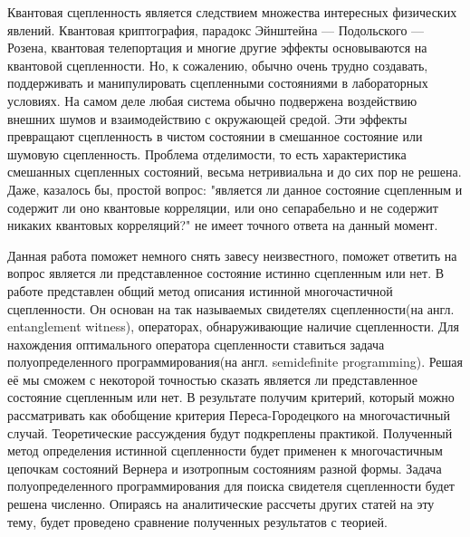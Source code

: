 Квантовая сцепленность является следствием множества интересных физических явлений.
Квантовая криптография\cite{PhysRevLett.67.661}, парадокс Эйнштейна — Подольского — Розена\cite{PhysRevLett.69.2881}, квантовая телепортация\cite{PhysRevLett.70.1895} и многие другие эффекты основываются на квантовой сцепленности.
Но, к сожалению, обычно очень трудно создавать, поддерживать и манипулировать сцепленными состояниями в лабораторных условиях.
На самом деле любая система обычно подвержена воздействию внешних шумов и взаимодействию с окружающей средой.
Эти эффекты превращают сцепленность в чистом состоянии в смешанное состояние или шумовую сцепленность.
Проблема отделимости, то есть характеристика смешанных сцепленных состояний, весьма нетривиальна и до сих пор не решена.
Даже, казалось бы, простой вопрос: "является ли данное состояние сцепленным и содержит ли оно квантовые корреляции, или оно сепарабельно и не содержит никаких квантовых корреляций?" не имеет точного ответа на данный момент.

Данная работа поможет немного снять завесу неизвестного, поможет  ответить на вопрос является ли представленное состояние истинно сцепленным или нет.
В работе представлен общий метод описания истинной многочастичной сцепленности.
Он основан на так называемых свидетелях сцепленности\cite{dariusz_2014}(на англ. entanglement witness), операторах, обнаруживающие наличие сцепленности.
Для нахождения оптимального оператора сцепленности ставиться задача полуопределенного программирования(на англ. semidefinite programming).
Решая её мы сможем с некоторой точностью сказать является ли представленное состояние сцепленным или нет.
В результате получим критерий, который можно рассматривать как обобщение критерия Переса-Городецкого\cite{criterion-peres-horodecki} на многочастичный случай.
Теоретические рассуждения будут подкреплены практикой.
Полученный метод определения истинной сцепленности будет применен к многочастичным цепочкам состояний Вернера и изотропным состояниям разной формы.
Задача полуопределенного программирования для поиска свидетеля сцепленности будет решена численно.
Опираясь на аналитические рассчеты других статей на эту тему, будет проведено сравнение полученных результатов с теорией.
